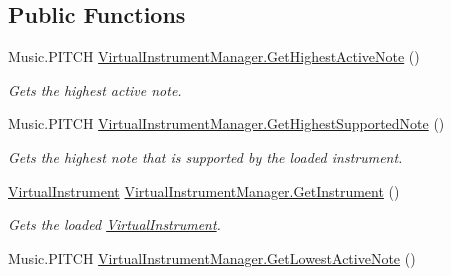 \subsection*{Public Functions}
\begin{DoxyCompactItemize}
\item 
\mbox{\label{group___virtual_instrument_manager_event_types_gab58eabfbcdaa60a3a7dbd972df6f57a6}} 
Music.\+P\+I\+T\+CH \hyperlink{group___virtual_instrument_manager_event_types_gab58eabfbcdaa60a3a7dbd972df6f57a6}{Virtual\+Instrument\+Manager.\+Get\+Highest\+Active\+Note} ()
\begin{DoxyCompactList}\small\item\em Gets the highest active note. \end{DoxyCompactList}\item 
\mbox{\label{group___virtual_instrument_manager_event_types_ga586d5ed5b0fe832d66c9a99aa160ceee}} 
Music.\+P\+I\+T\+CH \hyperlink{group___virtual_instrument_manager_event_types_ga586d5ed5b0fe832d66c9a99aa160ceee}{Virtual\+Instrument\+Manager.\+Get\+Highest\+Supported\+Note} ()
\begin{DoxyCompactList}\small\item\em Gets the highest note that is supported by the loaded instrument. \end{DoxyCompactList}\item 
\mbox{\label{group___virtual_instrument_manager_event_types_gac39a3e411417dc010f0e4fd8f146fbc3}} 
\hyperlink{class_virtual_instrument}{Virtual\+Instrument} \hyperlink{group___virtual_instrument_manager_event_types_gac39a3e411417dc010f0e4fd8f146fbc3}{Virtual\+Instrument\+Manager.\+Get\+Instrument} ()
\begin{DoxyCompactList}\small\item\em Gets the loaded \hyperlink{class_virtual_instrument}{Virtual\+Instrument}. \end{DoxyCompactList}\item 
\mbox{\label{group___virtual_instrument_manager_event_types_ga09bfbd0756fc8110c877e5b59c104bcd}} 
Music.\+P\+I\+T\+CH \hyperlink{group___virtual_instrument_manager_event_types_ga09bfbd0756fc8110c877e5b59c104bcd}{Virtual\+Instrument\+Manager.\+Get\+Lowest\+Active\+Note} ()

\end{DoxyCompactItemize}
